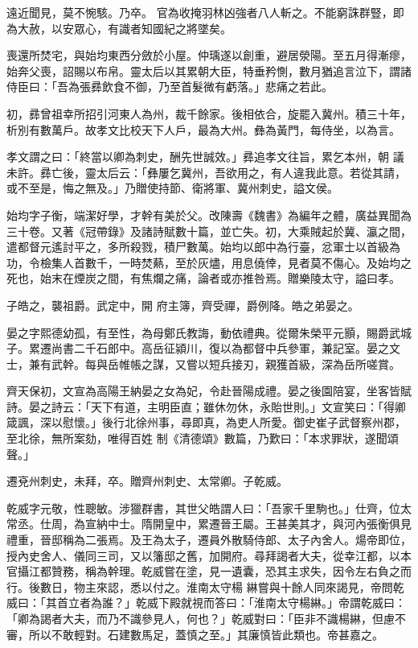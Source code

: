 \begin{pinyinscope}
 遠近聞見，莫不惋駭。乃卒。
 官為收掩羽林凶強者八人斬之。不能窮誅群豎，即為大赦，以安眾心，有識者知國紀之將墜矣。



 喪還所焚宅，與始均東西分斂於小屋。仲瑀遂以創重，避居滎陽。至五月得漸瘳，始奔父喪，詔賜以布帛。靈太后以其累朝大臣，特垂矜惻，數月猶追言泣下，謂諸侍臣曰：「吾為張彞飲食不御，乃至首髮微有虧落。」悲痛之若此。



 初，彞曾祖幸所招引河東人為州，裁千餘家。後相依合，旋罷入冀州。積三十年，析別有數萬戶。故孝文比校天下人戶，最為大州。彝為黃門，每侍坐，以為言。



 孝文謂之曰：「終當以卿為刺史，酬先世誠效。」彞追孝文往旨，累乞本州，朝
 議未許。彞亡後，靈太后云：「彝屢乞冀州，吾欲用之，有人違我此意。若從其請，或不至是，悔之無及。」乃贈使持節、衛將軍、冀州刺史，謚文侯。



 始均字子衡，端潔好學，才幹有美於父。改陳壽《魏書》為編年之體，廣益異聞為三十卷。又著《冠帶錄》及諸詩賦數十篇，並亡失。初，大乘賊起於冀、瀛之間，遣都督元遙討平之，多所殺戮，積尸數萬。始均以郎中為行臺，忿軍士以首級為功，令檢集人首數千，一時焚爇，至於灰燼，用息僥倖，見者莫不傷心。及始均之死也，始末在煙炭之間，有焦爛之痛，論者或亦推咎焉。贈樂陵太守，謚曰孝。



 子皓之，襲祖爵。武定中，開
 府主簿，齊受禪，爵例降。皓之弟晏之。



 晏之字熙德幼孤，有至性，為母鄭氏教誨，動依禮典。從爾朱榮平元顥，賜爵武城子。累遷尚書二千石郎中。高岳征潁川，復以為都督中兵參軍，兼記室。晏之文士，兼有武幹。每與岳帷帳之謀，又嘗以短兵接刃，親獲首級，深為岳所嗟賞。



 齊天保初，文宣為高陽王納晏之女為妃，令赴晉陽成禮。晏之後園陪宴，坐客皆賦詩。晏之詩云：「天下有道，主明臣直；雖休勿休，永貽世則。」文宣笑曰：「得卿箴諷，深以慰懷。」後行北徐州事，尋即真，為吏人所愛。御史崔子武督察州郡，至北徐，無所案劾，唯得百姓
 制《清德頌》數篇，乃歎曰：「本求罪狀，遂聞頌聲。」



 遷兗州刺史，未拜，卒。贈齊州刺史、太常卿。子乾威。



 乾威字元敬，性聰敏。涉獵群書，其世父皓謂人曰：「吾家千里駒也。」仕齊，位太常丞。仕周，為宣納中士。隋開皇中，累遷晉王屬。王甚美其才，與河內張衡俱見禮重，晉邸稱為二張焉。及王為太子，遷員外散騎侍郎、太子內舍人。煬帝即位，授內史舍人、儀同三司，又以籓邸之舊，加開府。尋拜謁者大夫，從幸江都，以本官攝江都贊務，稱為幹理。乾威嘗在塗，見一遺囊，恐其主求失，因令左右負之而行。後數日，物主來認，悉以付之。淮南太守楊
 綝嘗與十餘人同來謁見，帝問乾威曰：「其首立者為誰？」乾威下殿就視而答曰：「淮南太守楊綝。」帝謂乾威曰：「卿為謁者大夫，而乃不識參見人，何也？」乾威對曰：「臣非不識楊綝，但慮不審，所以不敢輕對。石建數馬足，蓋慎之至。」其廉慎皆此類也。帝甚嘉之。




\end{pinyinscope}
